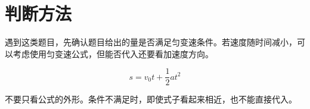 \section{判断方法}

遇到这类题目，先确认题目给出的量是否满足匀变速条件。若速度随时间减小，可以考虑使用匀变速公式，但能否代入还要看加速度方向。

\begin{equation}
  s=v_0t+\frac{1}{2}at^2
\end{equation}

不要只看公式的外形。条件不满足时，即使式子看起来相近，也不能直接代入。
